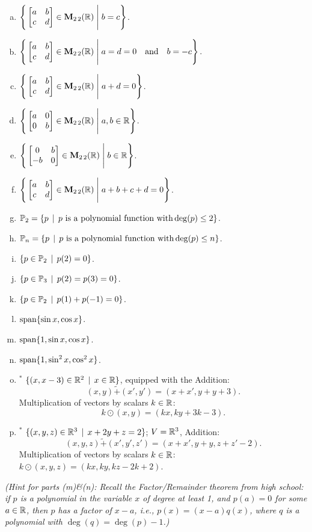 \begin{prob}
\begin{enumerate}[a)]
\item  $\Bigg\{  \bmatrix a&b\\ c&d\endbmatrix \in \M_{2 \,2}(\R) \;\Bigg|\; b=c\Bigg\}$.\medskip \medskip
%
\item\sov  $\Bigg\{  \bmatrix a&b\\ c&d\endbmatrix \in \M_{2 \,2}(\R) \;\Bigg|\;a=d=0\quad \text{and}\quad b=-c  \Bigg\}$.\medskip \medskip
%
\item  $\Bigg\{  \bmatrix a&b\\ c&d\endbmatrix \in \M_{2 \,2}(\R) \;\Bigg|\; a+d=0\Bigg\}$. \medskip
%

\item\sov  $\Bigg\{  \bmatrix a&0\\ 0&b\endbmatrix \in \M_{2 \,2}(\R) \;\Bigg|\;  a, b \in \R\Bigg\}$. \medskip
%


\item  $\Bigg\{  \bmatrix 0&b\\ -b&0\endbmatrix \in \M_{2 \,2}(\R) \;\Bigg|\; b \in \R\Bigg\}$.      \medskip
%

\item\sov  $\Bigg\{  \bmatrix a&b\\ c&d\endbmatrix \in \M_{2 \,2}(\R) \;\Bigg|\; a+b+c+d=0\Bigg\}$.      \medskip
% 
\item  $ \mathbb{P}_2=\{p\,\mid \, p \text{ is a polynomial function with} \deg(p)\le 2 \} $.  \medskip
%
\item\sov  $ \mathbb{P}_n=\{p\,\mid \, p \text{ is a polynomial function with} \deg(p)\le n \} $.  \medskip
%
\item  $ \{p \in \mathbb{P}_2 \,\mid \,  p(2)=0 \}$.  \medskip
%

\item\sov  $ \{p \in \mathbb{P}_3 \,\mid \,  p(2)=p(3)=0 \}$.  \medskip
%


\item  $ \{p \in \mathbb{P}_2 \,\mid \,  p(1)+p(-1)=0 \}$.      \medskip
%
\item\sov  $ \textrm{span}\{\sin x, \cos x\}$.      \medskip
%
\item  $ \textrm{span}\{1, \sin x, \cos x\}$.      \medskip
%
 \item\sov  $ \textrm{span}\{1, \sin^2 x, \cos^2 x\}$.      \medskip
%

\item$^\ast$  $\{(x, x-3) \in \mathbb{R}^2\,\mid \, x\in \mathbb{R} \}$,  equipped with the  Addition: $$(x,y) \tilde+ (x',y')=(x+x', y+y +3).$$ Multiplication of vectors  by  scalars $k\in \mathbb{R}$: 
$$k \odot (x,y)=(kx, ky+3k-3).$$    
%
\item$^\ast$  $\{(x, y, z) \in \mathbb{R}^3\,\mid \, x+2y+z=2  \}$; $V=\mathbb{R}^3$,  Addition: $$(x,y,z) \tilde+ (x',y',z')=(x+x', y+y,z+z'-2).$$ Multiplication of vectors  by  scalars $k\in \mathbb{R}$: $k\odot (x,y,z)=(kx, ky, kz-2k+2)$.\medskip 
% 
\end{enumerate}
{\it(Hint for parts (m)\&(n): Recall the Factor/Remainder theorem from high school: if $p$ is a  polynomial in the variable $x$ of degree at least 1,  and $p(a)=0$ for some $a \in \mathbb{R}$, then $p$ has a factor of $x-a$, i.e., $p(x)=(x-a)q(x)$, where $q$ is a polynomial with $\deg(q)=\deg(p)-1$.)}



\end{prob}
